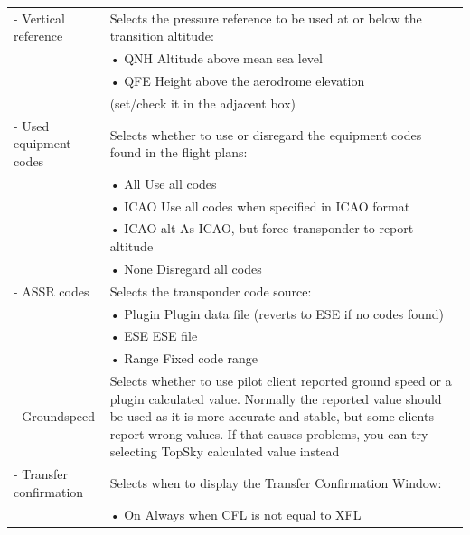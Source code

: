 \documentclass[11pt,a4paper,oldfontcommands]{memoir}
\begin{document}
\begin{tabular}{p{5cm} p{9cm}}
- Vertical reference      & Selects the pressure reference to be used at or below the transition altitude:\\
                          & \hspace{10pt}• QNH Altitude above mean sea level\\
                          & \hspace{10pt}• QFE Height above the aerodrome elevation\\
                          & (set/check it in the adjacent box)\\
- Used equipment codes    & Selects whether to use or disregard the equipment codes found in the flight plans:\\
                          & \hspace{10pt}• All Use all codes\\
                          & \hspace{10pt}• ICAO Use all codes when specified in ICAO format\\
                          & \hspace{10pt}• ICAO-alt As ICAO, but force transponder to report altitude\\
                          & \hspace{10pt}• None Disregard all codes\\
- ASSR codes              & Selects the transponder code source:\\
                          & \hspace{10pt}• Plugin Plugin data file (reverts to ESE if no codes found)\\
                          & \hspace{10pt}• ESE ESE file\\
                          & \hspace{10pt}• Range Fixed code range\\
- Groundspeed             & Selects whether to use pilot client reported ground speed or a plugin calculated value. Normally the reported value should be used as it is more accurate and stable, but some clients report wrong values. If that causes problems, you can try selecting TopSky calculated value instead\\ 
- Transfer confirmation   & Selects when to display the Transfer Confirmation Window:\\
                          & \hspace{10pt}• On Always when CFL is not equal to XFL\\

\end{tabular}
\end{document}
